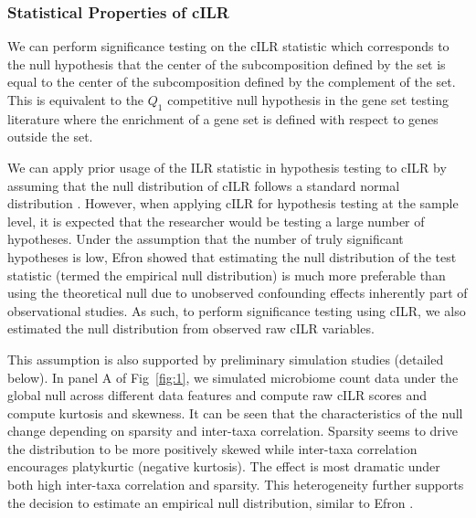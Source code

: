 \documentclass[10pt,letterpaper]{article}
\begin{document}
\subsubsection*{Statistical Properties of cILR}
We can perform significance testing on the cILR statistic which corresponds to the null hypothesis that the center of the subcomposition defined by the set is equal to the center of the subcomposition defined by the complement of the set. This is equivalent to the $Q_1$ competitive null hypothesis in the gene set testing literature \cite{tian2005} where the enrichment of a gene set is defined with respect to genes outside the set. 

We can apply prior usage of the ILR statistic in hypothesis testing to cILR by assuming that the null distribution of cILR follows a standard normal distribution \cite{egozcue2005}. However, when applying cILR for hypothesis testing at the sample level, it is expected that the researcher would be testing a large number of hypotheses. Under the assumption that the number of truly significant hypotheses is low, Efron \cite{efron2004} showed that estimating the null distribution of the test statistic (termed the empirical null distribution) is much more preferable than using the theoretical null due to unobserved confounding effects inherently part of observational studies. As such, to perform significance testing using cILR, we also estimated the null distribution from observed raw cILR variables. 

This assumption is also supported by preliminary simulation studies (detailed below). In panel A of Fig~\ref{fig:1}, we simulated microbiome count data under the global null across different data features and compute raw cILR scores and compute kurtosis and skewness. It can be seen that the characteristics of the null change depending on sparsity and inter-taxa correlation. Sparsity seems to drive the distribution to be more positively skewed while inter-taxa correlation encourages platykurtic (negative kurtosis). The effect is most dramatic under both high inter-taxa correlation and sparsity. This heterogeneity further supports the decision to estimate an empirical null distribution, similar to Efron \cite{efron2004}. 
\end{document}
